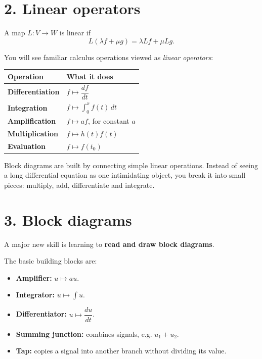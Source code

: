 \documentclass[11pt,a4paper]{article}
\begin{document}
\section{2. Linear operators}

A map $L:V\to W$ is linear if
\[
L(\lambda f+\mu g)=\lambda Lf+\mu Lg.
\]

You will see familiar calculus operations viewed as \emph{linear operators}:

\begin{center}
\begin{tabular}{>{\bfseries}p{4cm} p{7.5cm}}
\toprule
Operation & What it does \\
\midrule
Differentiation & $f\mapsto \dfrac{df}{dt}$ \\
Integration & $f\mapsto \displaystyle\int_0^x f(t)\,dt$ \\
Amplification & $f\mapsto af$, for constant $a$ \\
Multiplication & $f\mapsto h(t)f(t)$ \\
Evaluation & $f\mapsto f(t_0)$ \\
\bottomrule
\end{tabular}
\end{center}

\begin{rememberbox}
Block diagrams are built by connecting simple linear operations. Instead of seeing a long differential equation as one intimidating object, you break it into small pieces: multiply, add, differentiate and integrate.
\end{rememberbox}

\section{3. Block diagrams}

A major new skill is learning to \textbf{read and draw block diagrams}.

The basic building blocks are:
\begin{itemize}[leftmargin=1.2cm]
\item \textbf{Amplifier:} $u\mapsto au$.
\item \textbf{Integrator:} $u\mapsto \int u$.
\item \textbf{Differentiator:} $u\mapsto \dfrac{du}{dt}$.
\item \textbf{Summing junction:} combines signals, e.g. $u_1+u_2$.
\item \textbf{Tap:} copies a signal into another branch without dividing its value.
\end{itemize}
\end{document}
